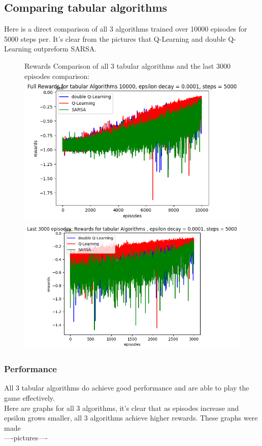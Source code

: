 \documentclass[twoside,11pt]{article}
\begin{document}
\subsection{Comparing tabular algorithms} 
{
Here is a direct comparison of all 3 algorithms trained over 10000 episodes for 5000 steps per. It's clear from the pictures that Q-Learning and double Q-Learning outpreform SARSA.
\begin{figure}[H]
Rewards Comparison of all 3 tabular algorithms and the last 3000 episodes comparison:\\
\includegraphics[scale=0.4]{Full_Rewards_Comparison1}
\includegraphics[scale=0.4]{Last_3000_rewards_comparison1}
\centering
\end{figure}
}
\subsubsection{Performance}
All 3 tabular algorithms do achieve good performance and are able to play the game effectively.
\\
Here are graphs for all 3 algorithms, it's clear that as episodes increase and epsilon grows smaller, all 3 algorithms achieve higher rewards. These graphs were made \\
----pictures----
\end{document}
